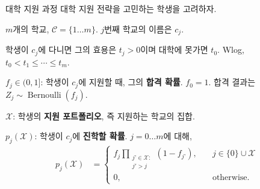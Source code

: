 \documentclass[10pt,slidestop,compress,mathserif,notheorems]{beamer}
\newif\ifen
\theoremstyle{definition}
\theoremstyle{definition}
\begin{document}
\begin{frame}{\ifen The college application process\else 대학 지원 과정\fi}
\ifen Consider a student deciding where to apply to college. 
\else 대학 지원 전략을 고민하는 학생을 고려하자. \fi

\ifen There are $m$ schools, $\mathcal{C} = \{ 1 \dots m\}$. The $j$th school is named $c_j$.
\else $m$개의 학교, $\mathcal{C} = \{ 1 \dots m\}$. $j$번째 학교의 이름은 $c_j$. \fi 

\ifen $t_j > 0$: \textbf{Utility} from attending $c_j$. Receive $t_0$ units of utility if she gets in nowhere.  Wlog, $t_0 < t_1 \leq \cdots \leq t_m$. 
\else 학생이 $c_j$에 다니면 그의 효용은 $t_j > 0$이며 대학에 못가면 $t_0$. Wlog, $t_0 < t_1 \leq \cdots \leq t_m$. \fi

\ifen $f_j \in (0, 1]$: \textbf{Probability of getting into} $c_j$ if she applies. $f_0 = 1$. Admissions outcome is $Z_j \sim \operatorname{Bernoulli}(f_j)$. 
\else $f_j \in (0, 1]$: 학생이 $c_j$에 지원할 때, 그의 \textbf{합격 확률}. $f_0 = 1$. 합격 결과는 $Z_j \sim \operatorname{Bernoulli}(f_j)$. \fi

\ifen $\mathcal{X}$: Student's \textbf{application portfolio}, the set of schools to which she chooses to apply. 
\else $\mathcal{X}$: 학생의 \textbf{지원 포트폴리오}, 즉 지원하는 학교의 집합.\fi

\ifen $p_j(\mathcal{X})$: \textbf{Probability that student attends} $c_j$. For $j= 0 \dots m$,
\else $p_j(\mathcal{X})$: 학생이 $c_j$에 \textbf{진학할 확률}. $j= 0 \dots m$에 대해,\fi
\begin{align*}
p_j(\mathcal{X}) &= 
\begin{cases}
\displaystyle f_j  \prod_{\substack{j’ \in \mathcal{X}: \\ j' > j}} (1 - f_{j’}), \quad & j \in \{0\}\cup\mathcal{X}\\
0, \quad & \text{otherwise.}
\end{cases} 
\end{align*}
\end{frame}
\end{document}
